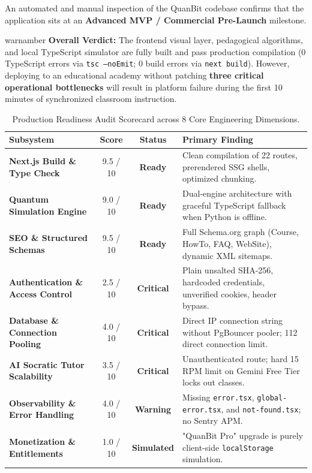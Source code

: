 \documentclass[11pt, a4paper]{article}
\begin{document}
An automated and manual inspection of the QuanBit codebase confirms that the application sits at an \textbf{Advanced MVP / Commercial Pre-Launch} milestone.

\begin{calloutbox}{warnamber}
\textbf{Overall Verdict:} The frontend visual layer, pedagogical algorithms, and local TypeScript simulator are fully built and pass production compilation ($0$ TypeScript errors via \texttt{tsc --noEmit}; $0$ build errors via \texttt{next build}). However, deploying to an educational academy without patching \textbf{three critical operational bottlenecks} will result in platform failure during the first 10 minutes of synchronized classroom instruction.
\end{calloutbox}

\begin{table}[h!]
\centering
\small
\begin{tabularx}{\textwidth}{l c c X}
\toprule
\textbf{Subsystem} & \textbf{Score} & \textbf{Status} & \textbf{Primary Finding} \\
\midrule
\textbf{Next.js Build \& Type Check} & 9.5 / 10 & \textcolor{successgreen}{\textbf{Ready}} & Clean compilation of 22 routes, prerendered SSG shells, optimized chunking. \\
\textbf{Quantum Simulation Engine} & 9.0 / 10 & \textcolor{successgreen}{\textbf{Ready}} & Dual-engine architecture with graceful TypeScript fallback when Python is offline. \\
\textbf{SEO \& Structured Schemas} & 9.5 / 10 & \textcolor{successgreen}{\textbf{Ready}} & Full Schema.org graph (Course, HowTo, FAQ, WebSite), dynamic XML sitemaps. \\
\textbf{Authentication \& Access Control} & 2.5 / 10 & \textcolor{dangerred}{\textbf{Critical}} & Plain unsalted SHA-256, hardcoded credentials, unverified cookies, header bypass. \\
\textbf{Database \& Connection Pooling} & 4.0 / 10 & \textcolor{dangerred}{\textbf{Critical}} & Direct IP connection string without PgBouncer pooler; 112 direct connection limit. \\
\textbf{AI Socratic Tutor Scalability} & 3.5 / 10 & \textcolor{dangerred}{\textbf{Critical}} & Unauthenticated route; hard 15 RPM limit on Gemini Free Tier locks out classes. \\
\textbf{Observability \& Error Handling} & 4.0 / 10 & \textcolor{warnamber}{\textbf{Warning}} & Missing \texttt{error.tsx}, \texttt{global-error.tsx}, and \texttt{not-found.tsx}; no Sentry APM. \\
\textbf{Monetization \& Entitlements} & 1.0 / 10 & \textcolor{warnamber}{\textbf{Simulated}} & "QuanBit Pro" upgrade is purely client-side \texttt{localStorage} simulation. \\
\bottomrule
\end{tabularx}
\caption{Production Readiness Audit Scorecard across 8 Core Engineering Dimensions.}
\label{tab:scorecard}
\end{table}
\end{document}
